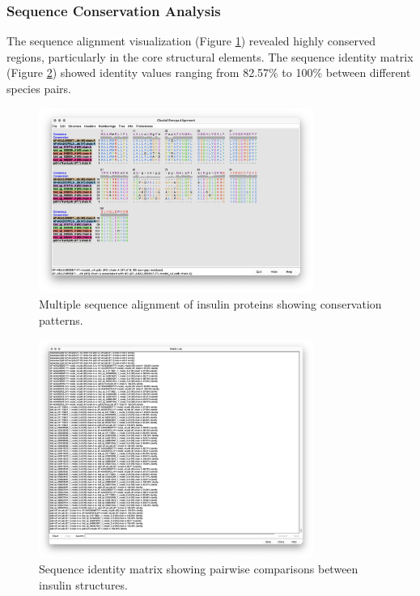 \documentclass[11pt, a4paper, hidelinks]{article}
\begin{document}
\subsubsection{Sequence Conservation Analysis}\label{subsubsec:conservation}
The sequence alignment visualization (Figure \ref{fig:sequence-alignment}) revealed highly conserved regions, particularly in the core structural elements. The sequence identity matrix (Figure \ref{fig:sequence-identity}) showed identity values ranging from 82.57\% to 100\% between different species pairs.

\begin{figure}[H]
    \centering
    \includegraphics[width=0.8\textwidth]{AAA59172.1/_img/seq alignment results}
    \caption{Multiple sequence alignment of insulin proteins showing conservation patterns.}
    \label{fig:sequence-alignment}
\end{figure}

\begin{figure}[H]
    \centering
    \includegraphics[width=0.8\textwidth]{AAA59172.1/_img/seq identity results}
    \caption{Sequence identity matrix showing pairwise comparisons between insulin structures.}
    \label{fig:sequence-identity}
\end{figure}
\end{document}

